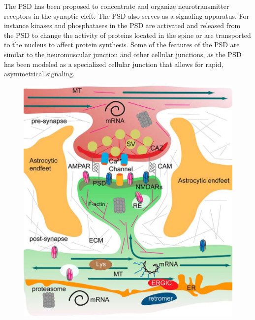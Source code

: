 The PSD has been proposed to concentrate and organize neurotransmitter receptors in the synaptic cleft. The PSD also serves as a signaling apparatus. For instance kinases and phosphatases in the PSD are activated and released from the PSD to change the activity of proteins located in the spine or are transported to the nucleus to affect protein synthesis. Some of the features of the PSD are similar to the neuromuscular junction and other cellular junctions, as the PSD has been modeled as a specialized cellular junction that allows for rapid, asymmetrical signaling.



\begin{figure}

{\centering \includegraphics[width=0.7\linewidth]{./figures/synapse/synapse_diagram} 

}


\end{figure}
